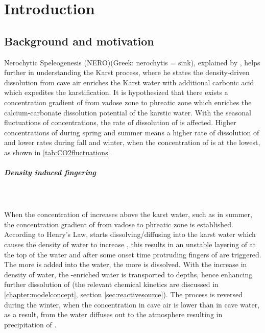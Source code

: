 \chapter{Introduction}\label{chapter:introduction}
\thispagestyle{empty}
\section{Background and motivation}
Nerochytic Speleogenesis (NERO)(Greek: nerochytis = sink), explained by \citet{Scherzer2017}, 
helps further in understanding the Karst process, where he states the density-driven  dissolution 
from cave air enriches the Karst water with additional carbonic acid which expedites the karstification. 
It is hypothesized that there exists a concentration gradient of  from vadose zone to phreatic zone 
which enriches the calcium-carbonate dissolution potential of the karstic water. 
With the seasonal fluctuations of  concentrations, the rate of dissolution of  is affected. 
Higher concentrations of  during spring and summer means a higher rate of dissolution of  and lower rates 
during fall and winter, when the concentration of  is at the lowest, as shown in \cref{tab:CO2fluctuations}.

\paragraph*{Density induced fingering}\mbox{}\\ \\
When the concentration of  increases above the karst water, such as in summer, the concentration gradient of  
from vadose to phreatic zone is established. According to Henry's Law,  starts dissolving/diffusing into the karst water 
which causes the density of water to increase \cite{garcia2001density}, this results in an unstable layering of  at 
the top of the water and after some onset time protruding fingers of  are triggered. The more  is added into the water, 
the more  is dissolved. With the increase in density of water, the -enriched water 
is transported to depths, hence enhancing further dissolution of  (the relevant chemical kinetics are 
discussed in \cref{chapter:modelconcept}, section \cref{sec:reactivesource}). The process is reversed during the winter, 
when the  concentration in cave air is lower than in cave water, as a result,  from the water diffuses 
out to the atmosphere resulting in precipitation of .\\ 

